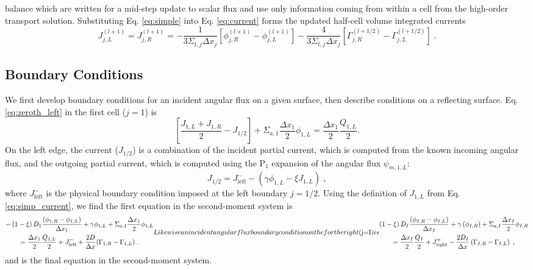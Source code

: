 balance which are written for a mid-step update to scalar flux and use only information coming from within a cell from the high-order transport solution.
Substituting Eq. \eqref{eq:simple} into Eq. \eqref{eq:current} forms the updated half-cell volume integrated currents 
\begin{equation}
\label{eq:simp_current}
    J_{j,L}^{(l+1)} = J_{j,R}^{(l+1)} = - \frac{1}{3 \Sigma_{t,j} \Delta x_j} \left[ \phi_{j,R}^{(l+1)} - \phi_{j,L}^{(l+1)} \right] - \frac{4}{3 \Sigma_{t,j} \Delta x_j} \left[ \Gamma_{j,R}^{(l+1/2)} - \Gamma_{j,L}^{(l+1/2)}  \right] \;.
\end{equation}


\subsection{Boundary Conditions}

We first develop boundary conditions for an incident angular flux on a given surface, then describe conditions on a reflecting surface.
Eq. \eqref{eq:zeroth_left} in the first cell ($j=1$) is
\begin{equation}
 \left[ \frac{J_{1,L} + J_{1,R}}{2} - J_{1/2} \right] + \Sigma_{a,1} \frac{\Delta x_1}{2} \phi_{1,L} = \frac{\Delta x_1}{2} \frac{Q_{1,L}}{2}. 
\end{equation}
On the left edge, the current ($J_{1/2}$) is a combination of the incident partial current, which is computed from the known incoming angular flux, and the outgoing partial current, which is computed using the P$_1$ expansion of the angular flux $\psi_{m,1,L}$:
\begin{equation}
    J_{1/2}= J^{-}_{\text{left}} - \left(\gamma \phi_{1,L} - \xi J_{1,L}\right) \; ,
\end{equation}
where $J^{-}_{\text{left}}$ is the physical boundary condition imposed at the left boundary $j=1/2$.
Using the definition of $J_{1,L}$ from Eq. \eqref{eq:simp_current}, we find the first equation in the second-moment system is
\begin{subequations}
\label{eq:bc_inc}
\begin{multline}
    -\left(1-\xi \right) D_1 \frac{\left( \phi_{1,R} - \phi_{1,L} \right)}{\Delta x_1} +\gamma  \phi_{1,L}  + \Sigma_{a,1} \frac{\Delta x_1}{2} \phi_{1,L} 
    \\ = 
    \frac{\Delta x_1}{2} \frac{Q_{1,L}}{2} +J^{-}_{\text{left}}+ 
    \frac{2D}{\Delta x}(\Gamma_{1,R}-\Gamma_{1,L}) \; .
\end{multline}
Likewise an incident angular flux boundary condition on the for the right ($j=I$) is
\begin{multline}
    \left(1-\xi \right) D_I \frac{\left( \phi_{I,R} - \phi_{I,L} \right)}{\Delta x_I} +\gamma \left( \phi_{I,R}   \right)
    + \Sigma_{a,I} \frac{\Delta x_I}{2} \phi_{I,R}\\ = 
    \frac{\Delta x_I}{2}\frac{Q_I}{2} + J_{\text{right}}^+ - \frac{2 D_I}{\Delta x} \left( \Gamma_{I,R} - \Gamma_{I,L}\right) \; ,
\end{multline}
\end{subequations}
and is the final equation in the second-moment system.

